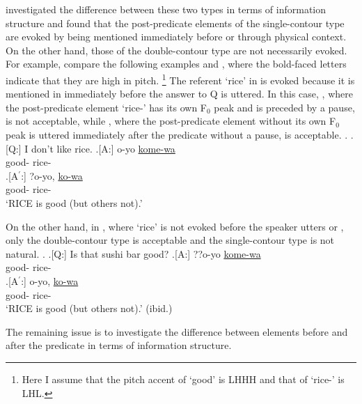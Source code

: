  investigated the difference between these two types in terms of information structure and found that
the post-predicate elements of the single-contour type are evoked
by being mentioned immediately before or through physical context.
On the other hand,
those of the double-contour type are not necessarily evoked.
For example, compare the following examples \Next and \NNext,
where the bold-faced letters indicate that
they are high in pitch.%
	\footnote{
	Here I assume that the pitch accent of  `good' is LHHH
	and that of  `rice-' is LHL.
	}
The referent `rice' in \Next is evoked
because it is mentioned in \Next[Q] immediately before the answer to Q is uttered.
In this case,
\Next[A$^{\prime}$],
where the post-predicate element  `rice-' has its own F$_{0}$ peak and is preceded by a pause,
is not acceptable,
while \Next[A],
where the post-predicate element without its own F$_{0}$ peak is uttered immediately after the predicate without a pause,
is acceptable.
%
\ex. 
 \a.[Q:] I don't like rice.
	\bg.[A:] o-yo \ul{kome-wa} \\
			good- rice- \\
	\bg.[A$^{\prime}$:] ?o-yo, \ul{ko-wa} \\
			good- rice- \\
			`RICE is good (but others not).'
			\hfill{\cite[][7]{nakagawaetal08_paper}}

On the other hand,
in \Next, where `rice' is not evoked before the speaker utters \Next[A] or \Next[A$^{\prime}$],
only the double-contour type \Next[A$^{\prime}$] is acceptable
and the single-contour type \Next[A] is not natural.
\ex. 
 \a.[Q:] Is that sushi bar good?
	\bg.[A:] ??o-yo \ul{kome-wa} \\
			good- rice- \\
	\bg.[A$^{\prime}$:] o-yo, \ul{ko-wa} \\
			good- rice- \\
			`RICE is good (but others not).'
			\hfill{(ibid.)}

The remaining issue is
to investigate the difference between elements before and after the predicate in terms of information structure.

